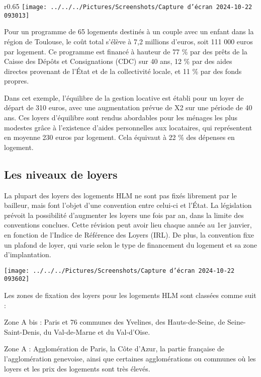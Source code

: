 \documentclass[a4paper, 12pt]{report}
\begin{document}
\begin{wrapfigure}{r}{0.65\textwidth}
	\centering
\texttt{[image: ../../../Pictures/Screenshots/Capture d'écran 2024-10-22 093013]}
\end{wrapfigure}

Pour un programme de 65 logements destinés à un couple avec un enfant dans la région de Toulouse, le coût total s'élève à 7,2 millions d'euros, soit 111 000 euros par logement. Ce programme est financé à hauteur de 77 \% par des prêts de la Caisse des Dépôts et Consignations (CDC) sur 40 ans, 12 \% par des aides directes provenant de l'État et de la collectivité locale, et 11 \% par des fonds propres.

Dans cet exemple, l'équilibre de la gestion locative est établi pour un loyer de départ de 310 euros, avec une augmentation prévue de X2 sur une période de 40 ans. Ces loyers d'équilibre sont rendus abordables pour les ménages les plus modestes grâce à l'existence d'aides personnelles aux locataires, qui représentent en moyenne 230 euros par logement. Cela équivaut à 22 \% des dépenses en logement.

\subsection{Les niveaux de loyers}

La plupart des loyers des logements HLM ne sont pas fixés librement par le bailleur, mais font l'objet d'une convention entre celui-ci et l'État. La législation prévoit la possibilité d'augmenter les loyers une fois par an, dans la limite des conventions conclues. Cette révision peut avoir lieu chaque année au 1er janvier, en fonction de l'Indice de Référence des Loyers (IRL). De plus, la convention fixe un plafond de loyer, qui varie selon le type de financement du logement et sa zone d'implantation.

\begin{center}
	\texttt{[image: ../../../Pictures/Screenshots/Capture d'écran 2024-10-22 093602]}
\end{center}
Les zones de fixation des loyers pour les logements HLM sont classées comme suit : 

Zone A bis : Paris et 76 communes des Yvelines, des Hauts-de-Seine, de Seine-Saint-Denis, du Val-de-Marne et du Val-d’Oise.

Zone A : Agglomération de Paris, la Côte d’Azur, la partie française de l’agglomération genevoise, ainsi que certaines agglomérations ou communes où les loyers et les prix des logements sont très élevés.
\end{document}
